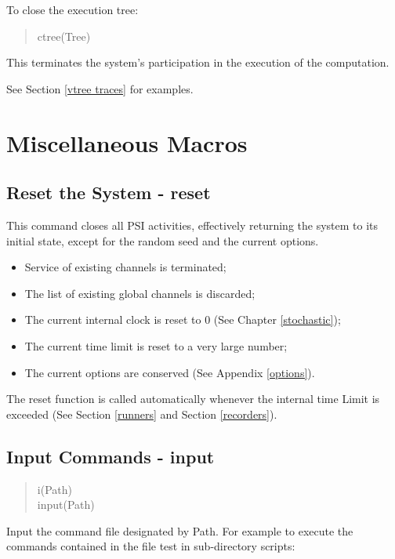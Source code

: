 \noindent
To close the execution tree:

\begin{verse}
    ctree(Tree)
\end{verse}

\noindent
This terminates the system's
participation in the execution of the computation.

\noindent
See Section \ref{vtree traces} for examples.

\section{Miscellaneous Macros}

\subsection{Reset the System - reset}

\label{reset}
This command closes all PSI activities,
effectively returning the system to its initial state,
except for the random seed and the current options.
\begin{itemize}
\item Service of existing channels is terminated;
\item The list of existing global channels is discarded;
\item The current internal clock is reset to 0
      (See Chapter \ref{stochastic});
\item The current time limit is reset to a very large number;
\item The current options are conserved (See Appendix \ref{options}).
\end{itemize}

\noindent
The reset function is called automatically whenever the internal
time Limit is exceeded
(See Section \ref{runners} and  Section \ref{recorders}).

\subsection{Input Commands - input}

\begin{verse}
    i(Path) \\
    input(Path)
\end{verse}

\noindent
Input the command file designated by Path.  For example to execute
the commands contained in the file test in sub-directory scripts:

